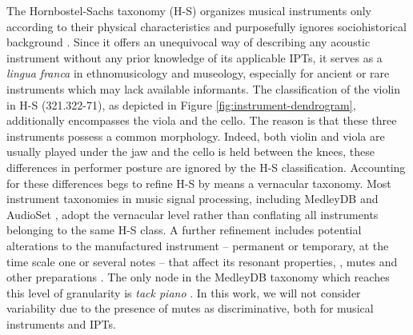 The Hornbostel-Sachs taxonomy (H-S) organizes musical instruments only according to their physical characteristics and purposefully ignores sociohistorical background \cite{montagu2009muzyka}.
Since it offers an unequivocal way of describing any acoustic instrument without any prior knowledge of its applicable IPTs, it serves as a \emph{lingua franca} in ethnomusicology and museology, especially for ancient or rare instruments which may lack available informants.
The classification of the violin in H-S (321.322-71), as depicted in Figure \ref{fig:instrument-dendrogram}, additionally encompasses the viola and the cello.
The reason is that these three instruments possess a common morphology.
Indeed, both violin and viola are usually played under the jaw and the cello is held between the knees, these differences in performer posture are ignored by the H-S classification.
Accounting for these differences begs to refine H-S by means a vernacular taxonomy.
Most instrument taxonomies in music signal processing, including MedleyDB \cite{bittner2014ismir} and AudioSet \cite{gemmeke2017icassp}, adopt the vernacular level rather than conflating all instruments belonging to the same H-S class.
A further refinement includes potential alterations to the manufactured instrument -- permanent or temporary, at the time scale one or several notes -- that affect its resonant properties, \eg{}, mutes and other preparations \cite{dianova2007phd}.
The only node in the MedleyDB taxonomy which reaches this level of granularity is \emph{tack piano} \cite{bittner2014ismir} .
In this work, we will not consider variability due to the presence of mutes as discriminative, both for musical instruments and IPTs.

